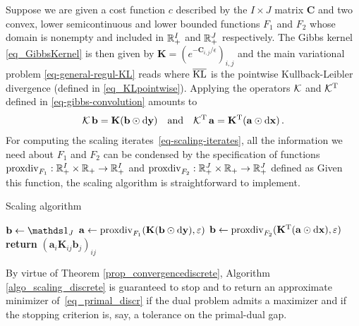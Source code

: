 Suppose we are given a cost function $c$ described by the $I\times J$ matrix $\mathbf{C}$ and two convex, lower semicontinuous and lower bounded functions $F_1$ and $F_2$ whose domain is nonempty and included in $\mathbb{R}_+^I$ and $\mathbb{R}_+^J$ respectively.
The Gibbs kernel \eqref{eq_GibbsKernel} is then given by $\mathbf{K} = (e^{-\mathbf{C}_{i,j}/\epsilon})_{i,j}$ and the main variational problem \eqref{eq-general-regul-KL} reads
where $\operatorname{\overline{\operatorname{KL}}}$ is the pointwise Kullback-Leibler divergence (defined in \eqref{eq_KLpointwise}).
%
Applying the operators $\mathcal{K}$ and ${\mathcal{K}}^{\mathrm{T}}$ defined in \eqref{eq-gibbs-convolution} amounts to
\begin{align*}
	\mathcal{K}\,\mathbf{b} = \mathbf{K}(\mathbf{b}\odot \mathbf{\mathrm{d} y})
	\quad \text{and} \quad 
	{\mathcal{K}}^{\mathrm{T}}\,\mathbf{a} = {\mathbf{K}}^{\mathrm{T}}(\mathbf{a}\odot \mathbf{\mathrm{d} x})\, .
\end{align*}
%
For computing the scaling iterates~\eqref{eq-scaling-iterates}, all the information we need about $F_1$ and $F_2$ can be condensed by the specification of functions $\operatorname{proxdiv}_{F_1} : \mathbb{R}_+^I\times \mathbb{R}_+ \to \mathbb{R}_+^I$ and $\operatorname{proxdiv}_{F_2} : \mathbb{R}_+^J\times \mathbb{R}_+ \to \mathbb{R}_+^J$ defined as
Given this function, the scaling algorithm is straightforward to implement.
%
%
\begin{algorithm}
\caption{Scaling algorithm}\label{algo_scaling_discrete}
\begin{algorithmic}[1]
   \State $\mathbf{b} \gets \ones_J$
   \Repeat
	\State $\mathbf{a} \gets \operatorname{proxdiv}_{F_1} (\mathbf{K}(\mathbf{b} \odot \mathbf{\mathrm{d} y}), \varepsilon)$
	\State $\mathbf{b} \gets \operatorname{proxdiv}_{F_2} ({\mathbf{K}}^{\mathrm{T}}(\mathbf{a} \odot \mathbf{\mathrm{d} x}),\varepsilon)$
   \State \textbf{return} $(\mathbf{a}_i \mathbf{K}_{ij} \mathbf{b}_j)_{ij}$
\EndFunction
\end{algorithmic}
\end{algorithm}
%
By virtue of Theorem \ref{prop_convergencediscrete}, Algorithm \ref{algo_scaling_discrete} is guaranteed to stop and to return an approximate minimizer of~\eqref{eq_primal_discr} if the dual problem admits a maximizer and if the stopping criterion is, say, a tolerance on the primal-dual gap.
